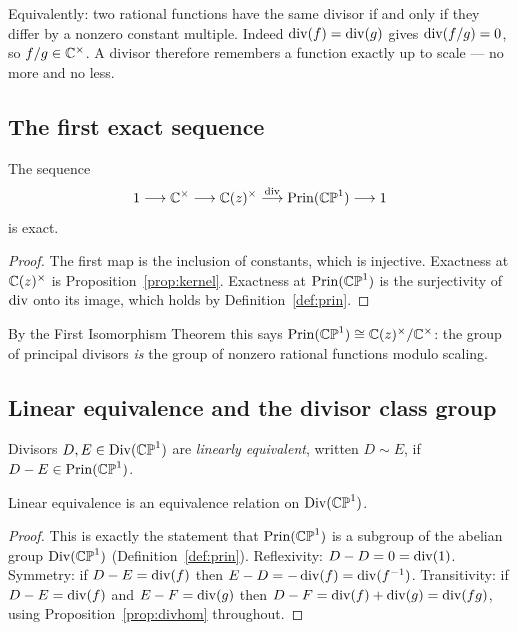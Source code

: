 \begin{remark}
Equivalently: two rational functions have the same divisor if and only if they
differ by a nonzero constant multiple. Indeed $\operatorname{div}(f) = \operatorname{div}(g)$ gives
$\operatorname{div}(f/g) = 0$, so $f/g \in \mathbb{C}^\times$. A divisor therefore remembers a
function exactly up to scale --- no more and no less.
\end{remark}

\subsection{The first exact sequence}

\begin{smjproposition}\label{prop:seq1}
The sequence
\[
1 \longrightarrow \mathbb{C}^\times \longrightarrow \mathbb{C}(z)^\times
\stackrel{\operatorname{div}}{\longrightarrow} \operatorname{Prin}(\mathbb{CP}^1) \longrightarrow 1
\]
is exact.
\end{smjproposition}

\begin{proof}
The first map is the inclusion of constants, which is injective. Exactness at
$\mathbb{C}(z)^\times$ is Proposition~\ref{prop:kernel}. Exactness at $\operatorname{Prin}(\mathbb{CP}^1)$ is
the surjectivity of $\operatorname{div}$ onto its image, which holds by
Definition~\ref{def:prin}.
\end{proof}

\begin{remark}
By the First Isomorphism Theorem this says
$\operatorname{Prin}(\mathbb{CP}^1) \cong \mathbb{C}(z)^\times / \mathbb{C}^\times$: the group of principal divisors
\emph{is} the group of nonzero rational functions modulo scaling.
\end{remark}

\subsection{Linear equivalence and the divisor class group}

\begin{definition}\label{def:lineq}
Divisors $D, E \in \operatorname{Div}(\mathbb{CP}^1)$ are \emph{linearly equivalent}, written
$D \sim E$, if $D - E \in \operatorname{Prin}(\mathbb{CP}^1)$.
\end{definition}

\begin{smjproposition}
Linear equivalence is an equivalence relation on $\operatorname{Div}(\mathbb{CP}^1)$.
\end{smjproposition}

\begin{proof}
This is exactly the statement that $\operatorname{Prin}(\mathbb{CP}^1)$ is a subgroup of the abelian
group $\operatorname{Div}(\mathbb{CP}^1)$ (Definition~\ref{def:prin}). Reflexivity: $D - D = 0 =
\operatorname{div}(1)$. Symmetry: if $D - E = \operatorname{div}(f)$ then
$E - D = -\operatorname{div}(f) = \operatorname{div}(f^{-1})$. Transitivity: if $D - E = \operatorname{div}(f)$ and
$E - F = \operatorname{div}(g)$ then $D - F = \operatorname{div}(f) + \operatorname{div}(g) = \operatorname{div}(fg)$, using
Proposition~\ref{prop:divhom} throughout.
\end{proof}

